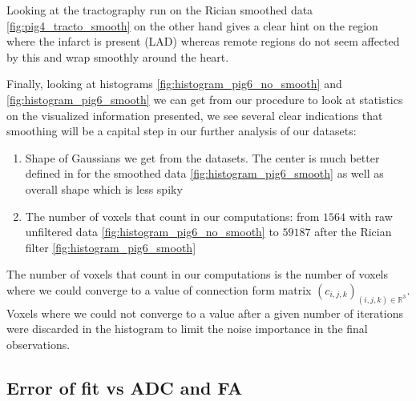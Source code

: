 Looking at the tractography run on the Rician smoothed data \ref{fig:pig4_tracto_smooth} on the other hand gives a clear hint on the region where the infarct is present (LAD) whereas remote regions do not seem affected by this and wrap smoothly around the heart.

Finally, looking at histograms \ref{fig:histogram_pig6_no_smooth} and \ref{fig:histogram_pig6_smooth} we can get from our procedure to look at statistics on the visualized information presented, we see several clear indications that smoothing will be a capital step in our further analysis of our datasets:
\begin{enumerate}
    \item Shape of Gaussians we get from the datasets. The center is much better defined in for the smoothed data \ref{fig:histogram_pig6_smooth} as well as overall shape which is less spiky
    \item The number of voxels that count in our computations: from $1564$ with raw unfiltered data \ref{fig:histogram_pig6_no_smooth} to $59187$ after the Rician filter \ref{fig:histogram_pig6_smooth}
\end{enumerate}
The number of voxels that count in our computations is the number of voxels where we could converge to a value of connection form matrix $(c_{i, j, k})_{(i, j, k) \in \mathbb{R}^3}$. Voxels where we could not converge to a value after a given number of iterations were discarded in the histogram to limit the noise importance in the final observations.

\subsection{Error of fit vs ADC and FA}

